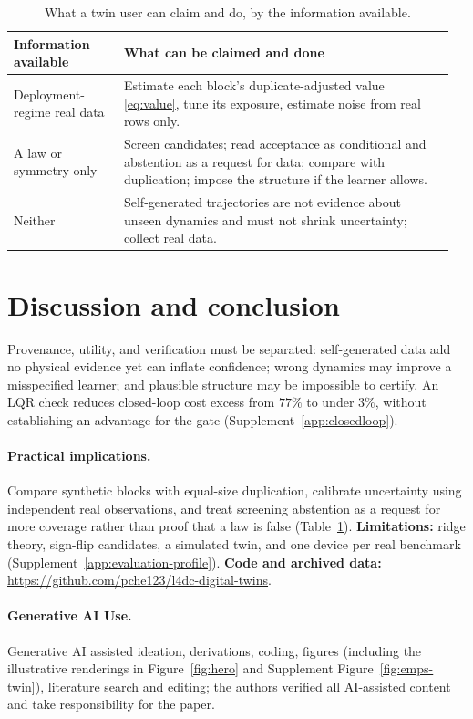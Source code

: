 \documentclass{l4dc2027}
\begin{document}
\begin{table}[t]
\centering\small
\caption{What a twin user can claim and do, by the information available.}
\label{tab:regimes}
\begin{tabular}{@{}>{\raggedright\arraybackslash}p{0.24\linewidth}>{\raggedright\arraybackslash}p{0.72\linewidth}@{}}
\toprule
Information available & What can be claimed and done\\
\midrule
Deployment-regime real data & Estimate each block's duplicate-adjusted value \eqref{eq:value}, tune its exposure, estimate noise from real rows only.\\
A law or symmetry only & Screen candidates; read acceptance as conditional and abstention as a request for data; compare with duplication; impose the structure if the learner allows.\\
Neither & Self-generated trajectories are not evidence about unseen dynamics and must not shrink uncertainty; collect real data.\\
\bottomrule
\end{tabular}
\end{table}

\section{Discussion and conclusion}
Provenance, utility, and verification must be separated: self-generated data add no physical evidence yet can inflate confidence; wrong dynamics may improve a misspecified learner; and plausible structure may be impossible to certify. An LQR check reduces closed-loop cost excess from $77\%$ to under $3\%$, without establishing an advantage for the gate (Supplement~\ref{app:closedloop}).
\paragraph{Practical implications.} Compare synthetic blocks with equal-size duplication, calibrate uncertainty using independent real observations, and treat screening abstention as a request for more coverage rather than proof that a law is false (Table~\ref{tab:regimes}). \textbf{Limitations:} ridge theory, sign-flip candidates, a simulated twin, and one device per real benchmark (Supplement~\ref{app:evaluation-profile}). \textbf{Code and archived data:} \url{https://github.com/pche123/l4dc-digital-twins}.

\paragraph{Generative AI Use.} Generative AI assisted ideation, derivations, coding, figures (including the illustrative renderings in Figure~\ref{fig:hero} and Supplement Figure~\ref{fig:emps-twin}), literature search and editing; the authors verified all AI-assisted content and take responsibility for the paper.
\end{document}
